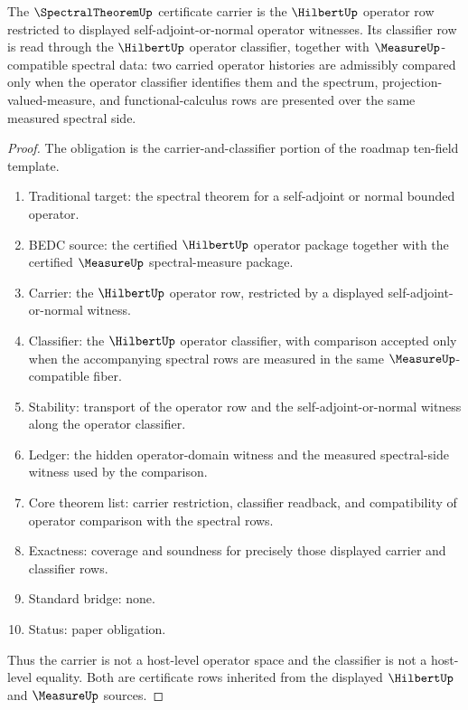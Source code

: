 \begin{theorem}
\label{thm:spectraltheorem-obligation-carrier-classifier}
The $\SpectralTheoremUp$ certificate carrier is the $\HilbertUp$ operator row restricted to displayed self-adjoint-or-normal operator witnesses. Its classifier row is read through the $\HilbertUp$ operator classifier, together with $\MeasureUp$-compatible spectral data: two carried operator histories are admissibly compared only when the operator classifier identifies them and the spectrum, projection-valued-measure, and functional-calculus rows are presented over the same measured spectral side.
\end{theorem}
\begin{proof}
The obligation is the carrier-and-classifier portion of the roadmap ten-field template.
\begin{enumerate}
  \item Traditional target: the spectral theorem for a self-adjoint or normal bounded operator.
  \item BEDC source: the certified $\HilbertUp$ operator package together with the certified $\MeasureUp$ spectral-measure package.
  \item Carrier: the $\HilbertUp$ operator row, restricted by a displayed self-adjoint-or-normal witness.
  \item Classifier: the $\HilbertUp$ operator classifier, with comparison accepted only when the accompanying spectral rows are measured in the same $\MeasureUp$-compatible fiber.
  \item Stability: transport of the operator row and the self-adjoint-or-normal witness along the operator classifier.
  \item Ledger: the hidden operator-domain witness and the measured spectral-side witness used by the comparison.
  \item Core theorem list: carrier restriction, classifier readback, and compatibility of operator comparison with the spectral rows.
  \item Exactness: coverage and soundness for precisely those displayed carrier and classifier rows.
  \item Standard bridge: none.
  \item Status: paper obligation.
\end{enumerate}

Thus the carrier is not a host-level operator space and the classifier is not a host-level equality. Both are certificate rows inherited from the displayed $\HilbertUp$ and $\MeasureUp$ sources.
\end{proof}


